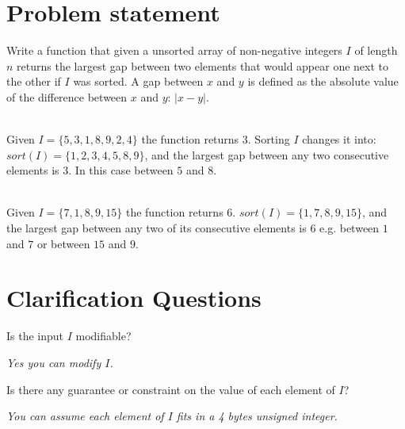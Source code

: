 \section{Problem statement}
\begin{exercise}
\label{example:max_gap:exercice1}
Write a function that given a unsorted array of non-negative integers $I$ of length $n$ returns the
largest gap between two elements that would appear one next to the other  
if $I$ was sorted. A gap between $x$ and $y$ is defined as the absolute value of the difference
between $x$ and $y$: $|x-y|$.

	\begin{example}
		\label{example:max_gap:example1}
		\hfill \\
		Given $I = \{5,3,1,8,9,2,4\}$ the function returns $3$. Sorting $I$ changes it into:
		$sort(I)= \{1,2,3,4,5,8,9\}$, and the largest gap between any two consecutive elements is
		$3$. In this case between $5$ and $8$.		
	\end{example}

	\begin{example}
		\label{example:max_gap:example2}
		\hfill \\
		Given $I = \{7, 1, 8, 9,15\}$ the function returns $6$. $sort(I)= \{1,7,8,9,15\}$, and the
		largest gap between any two of its consecutive elements is $6$ e.g. between $1$ and $7$ or
		between $15$ and $9$.	
	\end{example}
	
\end{exercise}

\section{Clarification Questions}

\begin{QandA}
	\item \begin{questionitem} \begin{question} Is the input $I$ modifiable?  \end{question} 	 
    \begin{answered}
		\textit{Yes you can modify $I$.}
	\end{answered} \end{questionitem}

	\item \begin{questionitem} \begin{question} Is there any guarantee or constraint on the value of each element of $I$?  \end{question} 	 
    \begin{answered}
		\textit{You can assume each element of $I$  fits in a 4 bytes unsigned integer.}
	\end{answered} \end{questionitem}
	
\end{QandA}

